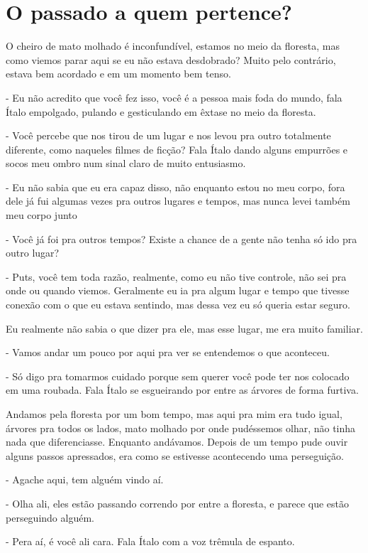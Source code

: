 \chapter{O passado a quem pertence?}
O cheiro de mato molhado é inconfundível, estamos no meio da floresta, mas como viemos parar aqui se eu não estava desdobrado? Muito pelo contrário, estava bem acordado e em um momento bem tenso.

- Eu não acredito que você fez isso, você é a pessoa mais foda do mundo, fala Ítalo empolgado, pulando e gesticulando em êxtase no meio da floresta.

- Você percebe que nos tirou de um lugar e nos levou pra outro totalmente diferente, como naqueles filmes de ficção? Fala Ítalo dando alguns empurrões e socos meu ombro num sinal claro de muito entusiasmo.

- Eu não sabia que eu era capaz disso, não enquanto estou no meu corpo, fora dele já fui algumas vezes pra outros lugares e tempos, mas nunca levei também meu corpo junto

- Você já foi pra outros tempos? Existe a chance de a gente não tenha só ido pra outro lugar?

- Puts, você tem toda razão, realmente, como eu não tive controle, não sei pra onde ou quando viemos. Geralmente eu ia pra algum lugar e tempo que tivesse conexão com o que eu estava sentindo, mas dessa vez eu só queria estar seguro.

Eu realmente não sabia o que dizer pra ele, mas esse lugar, me era muito familiar.

- Vamos andar um pouco por aqui pra ver se entendemos o que aconteceu.

- Só digo pra tomarmos cuidado porque sem querer você pode ter nos colocado em uma roubada. Fala Ítalo se esgueirando por entre as árvores de forma furtiva.

Andamos pela floresta por um bom tempo, mas aqui pra mim era tudo igual, árvores pra todos os lados, mato molhado por onde pudéssemos olhar, não tinha nada que diferenciasse. Enquanto andávamos. Depois de um tempo pude ouvir alguns passos apressados, era como se estivesse acontecendo uma perseguição.

- Agache aqui, tem alguém vindo aí.

- Olha ali, eles estão passando correndo por entre a floresta, e parece que estão perseguindo alguém.

- Pera aí, é você ali cara. Fala Ítalo com a voz trêmula de espanto.


